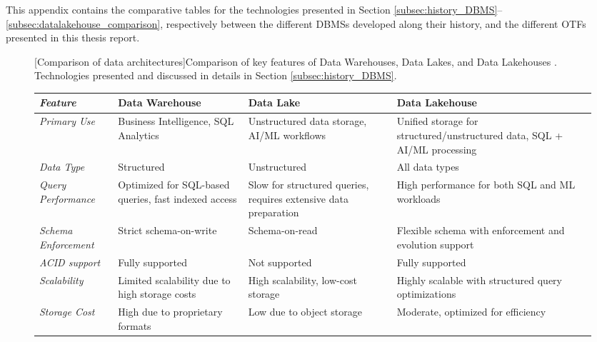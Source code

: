 This appendix contains the comparative tables for the technologies presented in Section \ref{subsec:history_DBMS}--\ref{subsec:datalakehouse_comparison}, respectively between the different \glspl{DBMS} developed along their history, and the different \Glspl{OTF} presented in this thesis report.




\begin{figure}
    \centering
    \begin{minipage}[b]{\textwidth}
        \centering
        [Comparison of data architectures]{Comparison of key features of Data Warehouses, Data Lakes, and Data Lakehouses \cite{inmonFiveStepsSuccessful}. Technologies presented and discussed in details in Section \ref{subsec:history_DBMS}.}
        \label{tbl:DBMS_comparison}
            \begin{tabular}{|p{2.2cm}|p{3cm}|p{2.9cm}|p{3cm}|}
            \hline
            \textit{\textbf{Feature}} & \textbf{Data Warehouse} & \textbf{Data Lake} & \textbf{Data Lakehouse} \\
            \hline
            \textit{Primary Use} & Business Intelligence, \gls{SQL} Analytics & Unstructured data storage, \gls{AI}/\gls{ML} workflows & Unified storage for structured/unstructured data, \gls{SQL} + \gls{AI}/\gls{ML} processing \\
            \hline
            \textit{Data Type} & Structured & Unstructured & All data types \\
            \hline
            \textit{Query Performance} & Optimized for \gls{SQL}-based queries, fast indexed access & Slow for structured queries, requires extensive data preparation & High performance for both \gls{SQL} and \gls{ML} workloads \\
            \hline
            \textit{Schema Enforcement} & Strict schema-on-write & Schema-on-read & Flexible schema with enforcement and evolution support \\
            \hline
            \textit{\gls{ACID} support} & Fully supported & Not supported & Fully supported \\
            \hline
            \textit{Scalability} & Limited scalability due to high storage costs & High scalability, low-cost storage & Highly scalable with structured query optimizations \\
            \hline
            \textit{Storage Cost} & High due to proprietary formats & Low due to object storage & Moderate, optimized for efficiency \\

\end{tabular}
\end{minipage}
\end{figure}
